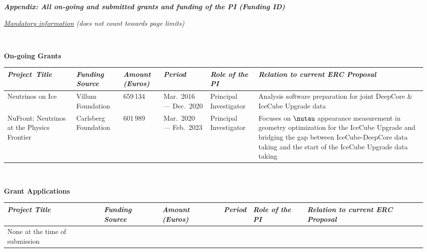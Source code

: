\documentclass[a4paper,11pt]{article}
\renewcommand{\smallskip} {\vspace{0.1in}}
\begin{document}
%
\newpage 




\centerline{ {\textit{\textbf{ Appendix: All on-going and submitted grants and funding of the PI (Funding ID)}}
}} \smallskip
\centerline{ \it \underline{Mandatory information} (does not count towards page limits)
}\smallskip

~\vspace{2cm}

{\bf On-going Grants}
\begin{table}[h]
\centering
\begin{tabularx}{1\textwidth}{|C{0.125\textwidth}|C{0.125\textwidth}|C{0.0817\textwidth}|C{0.125\textwidth}|C{0.125\textwidth}|C{0.26\textwidth}|}
\hline
{} \it Project~Title & \it Funding Source & \it Amount (Euros) & \it Period & \it Role of the PI & \it Relation to current ERC Proposal\\
\hline
Neutrinos on Ice & Villum Foundation & 659\,134& Mar.~2016 --- Dec.~2020 & Principal Investigator & Analysis software preparation for joint DeepCore \& IceCube Upgrade data \\
\hline
NuFront: Neutrinos at the Physics Frontier& Carlsberg Foundation & 601\,989& Mar.~2020 --- Feb.~2023 & Principal Investigator & Focuses on $\nutau$ appearance measurement in geometry optimization for the IceCube Upgrade and bridging the gap between IceCube-DeepCore data taking and the start of the IceCube Upgrade data taking \\
\hline
\end{tabularx}
\end{table}

~\vspace{2cm}


{\bf Grant Applications}
\begin{table}[h]
\centering
\begin{tabularx}{1\textwidth}{|C{0.125\textwidth}|C{0.125\textwidth}|C{0.0817\textwidth}|C{0.125\textwidth}|C{0.125\textwidth}|C{0.26\textwidth}|}
\hline
{} \it  Project Title & \it Funding Source & \it Amount (Euros) & \it Period & \it Role of the PI & \it Relation to current ERC Proposal\\
\hline
None at the time of submission & $~~~~~~~~~~~~~~~~~~~$ & & & & \\
\hline
\end{tabularx}
\end{table}
\end{document}
